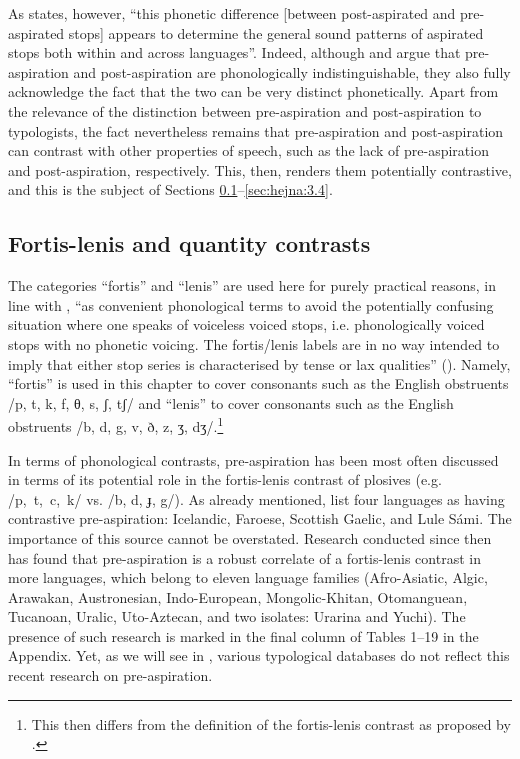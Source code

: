 \documentclass[output=paper]{langscibook}
\begin{document}
As \citet[94]{Blevins2004} states, however, “this phonetic difference [between post-aspirated and pre-aspirated stops] appears to determine the general sound patterns of aspirated stops both within and across languages”. Indeed, although \citet[327]{KehreinGolston2004} and \citet{Kehrein2002} argue that pre\hyp aspiration and post-aspiration are phonologically indistinguishable, they also fully acknowledge the fact that the two can be very distinct phonetically. Apart from the relevance of the distinction between pre\hyp aspiration and post-aspiration to typologists, the fact nevertheless remains that pre\hyp aspiration and post-aspiration can contrast with other properties of speech, such as the lack of pre\hyp aspiration and post-aspiration, respectively. This, then, renders them potentially contrastive, and this is the subject of Sections \ref{sec:hejna:3.3}--\ref{sec:hejna:3.4}.

\subsection{Fortis-lenis and quantity contrasts}\label{sec:hejna:3.3}

The categories “fortis” and “lenis” are used here for purely practical reasons, in line with \citet[105]{Chasaide1985}, “as convenient phonological terms to avoid the potentially confusing situation where one speaks of voiceless voiced stops, i.e. phonologically voiced stops with no phonetic voicing. The fortis/lenis labels are in no way intended to imply that either stop series is characterised by tense or lax qualities” (\citeyear[105]{Chasaide1985}). Namely, “fortis” is used in this chapter to cover consonants such as the English obstruents /p, t, k, f, θ, s, ʃ, tʃ/ and “lenis” to cover consonants such as the English obstruents /b, d, g, v, ð, z, ʒ, dʒ/.\footnote{This then differs from the definition of the fortis-lenis contrast as proposed by \citet{Trubetzkoy1939}.}

In terms of phonological contrasts, pre\hyp aspiration has been most often discussed in terms of its potential role in the fortis-lenis contrast of plosives (e.g. \mbox{/p, t, c, k/} vs. /b, d, ɟ, g/). As already mentioned, \citet[70]{LadefogedMaddieson1996} list four languages as having contrastive pre-aspiration: Icelandic, Faroese, Scottish Gaelic, and Lule Sámi. The importance of this source cannot be overstated. Research conducted since then has found that pre\hyp aspiration is a robust correlate of a fortis-lenis contrast in more languages, which belong to eleven language families (Afro-Asiatic, Algic, Arawakan, Austronesian, Indo-European, Mongolic-Khitan, Otomanguean, Tucanoan, Uralic, Uto-Aztecan, and two isolates: Urarina and Yuchi). The presence of such research is marked in the final column of Tables 1--19 in the Appendix. Yet, as we will see in , various typological databases do not reflect this recent research on pre-aspiration.
\end{document}
